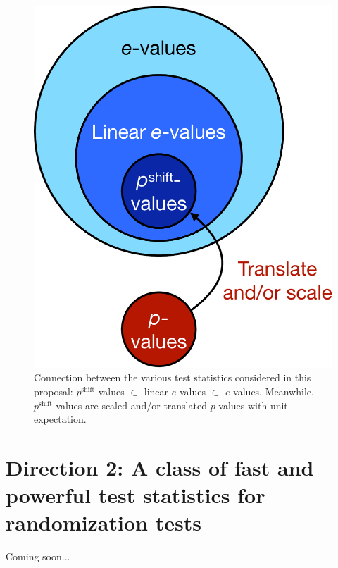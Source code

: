 \documentclass[12pt]{article}
\begin{document}
\begin{figure}
	\centering
	\includegraphics[width=0.4\linewidth]{test_stat_fig_crop}
	\caption{Connection between the various test statistics considered in this proposal: $p^\textrm{shift}$-values $\subset$ linear $e$-values $\subset$ $e$-values. Meanwhile, $p^\textrm{shift}$-values are scaled and/or translated $p$-values with unit expectation.}
	\label{fig:test_stats}
\end{figure}


\section*{Direction 2: A class of fast and powerful test statistics for randomization tests}
Coming soon...
\end{document}
